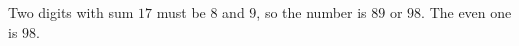 Two digits with sum $17$ must be $8$ and $9$, so the number is $89$ or $98$. The even one is $\boxed{98}$.

